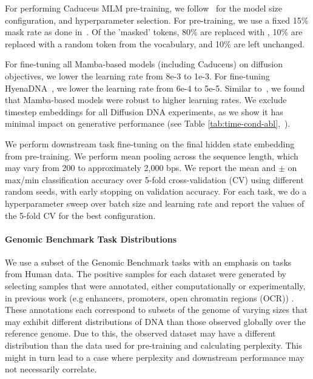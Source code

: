 \documentclass{article} %
\begin{document}
{\begin{appendices}
For performing Caduceus MLM pre-training, we follow~\citet{schiff2024caduceus} for the model size configuration, and hyperparameter selection. For pre-training, we use a fixed 15\% mask rate as done in~\citet{devlin2018bert}. Of the 'masked' tokens, 80\% are replaced with \mask, 10\% are replaced with a random token from the vocabulary, and 10\% are left unchanged.

For fine-tuning all Mamba-based models (including Caduceus) on diffusion objectives, we lower the learning rate from 8e-3 to 1e-3. For fine-tuning HyenaDNA~\citep{nguyen2024hyenadna}, we lower the learning rate from 6e-4 to 5e-5. Similar to~\citet{gu2021efficiently, schiff2024caduceus}, we found that Mamba-based models were robust to higher learning rates. We exclude timestep embeddings for all Diffusion DNA experiments, as we show it has minimal impact on generative performance (see Table \ref{tab:time-cond-abl},~).

We perform downstream task fine-tuning on the final hidden state embedding from pre-training. We perform mean pooling across the sequence length,
which may vary from 200 to approximately 2,000 bps. We report the mean and $\pm$ on max/min classification accuracy over 5-fold cross-validation (CV) using
different random seeds, with early stopping on validation accuracy. For each task, we do a hyperparameter sweep over batch size and learning rate and report the values of the 5-fold CV for the best configuration.

\paragraph{Genomic Benchmark Task Distributions}
We use a subset of the Genomic Benchmark tasks with an emphasis on tasks from Human data. The positive samples for each dataset were generated by selecting samples that were annotated, either computationally or experimentally, in previous work (e.g enhancers, promoters, open chromatin regions (OCR)) \cite{grevsova2023genomic}. These annotations each correspond to subsets of the genome of varying sizes that may exhibit different distributions of DNA than those observed globally over the reference genome.
Due to this, the observed dataset may have a different distribution than the data used for pre-training and calculating perplexity. This might in turn lead to a case where perplexity and downstream performance may not necessarily correlate.   










\end{appendices}}
\end{document}
